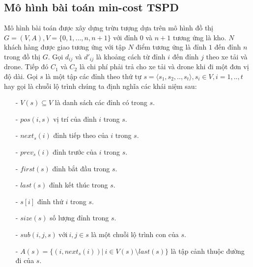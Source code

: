 \documentclass[a4paper,12pt]{report}
\begin{document}
\subsection{Mô hình bài toán min-cost TSPD}
Mô hình bài toán được xây dựng trừu tượng dựa trên mô hình đồ thị $G=(V,A), V=\{0,1,...,n,n+1\}$ với đỉnh $0$ và $n+1$ tương ứng là kho. $N$ khách hàng được giao tương ứng với tập $N$ điểm tương ứng là đỉnh $1$ đến đỉnh $n$ trong đồ thị $G$. Gọi $d_{ij}$ và $d'_{ij}$ là khoảng cách từ đỉnh $i$ đến đỉnh $j$ theo xe tải và drone. Tiếp đó $C_1$ và $C_2$ là chi phí phải trả cho xe tải và drone khi đi một đơn vị độ dài.  
Gọi $s$ là một tập các đỉnh theo thứ tự $s=\langle s_1,s_2,..,s_t \rangle , s_i \in V, i=1,..,t$ hay gọi là chuỗi lộ trình chúng ta định nghĩa các khái niệm sau:

\begin{itemize}
\item[-] $V(s) \subseteq V$ là danh sách các đỉnh có trong $s$.
\item[-] $pos(i,s)$ vị trí của đỉnh $i$ trong $s$.
\item[-] $next_s(i)$ đỉnh tiếp theo của $i$ trong $s$.
\item[-] $prev_s(i)$ đỉnh trước của $i$ trong $s$.
\item[-] $first(s)$ đỉnh bắt đầu trong $s$.
\item[-] $last(s)$ đỉnh kết thúc trong $s$.
\item[-] $s[i]$ đỉnh thứ $i$ trong $s$.
\item[-] $size(s)$ số lượng đỉnh trong $s$.
\item[-] $sub(i,j,s) \ \text{với} \ i,j \in s $ là một chuỗi lộ trình con của $s$.
\item[-] $A(s)=\{(i,next_s(i))| \ i \in V(s)\setminus last(s)\}$ là tập cảnh thuộc đường đi của $s$.

\end{itemize}
\end{document}
